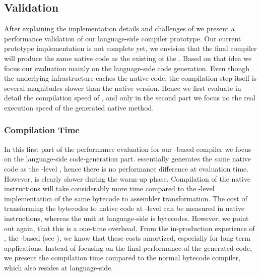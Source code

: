 
\subsection{\NBJ Validation}
After explaining the implementation details and challenges of \NBJ we present a performance validation of our language-side \JIT compiler prototype.
Our current prototype implementation is not complete yet, we envision that the final compiler will produce the same native code as the existing \JIT of the \Cog \VM.
Based on that idea we focus our evaluation mainly on the language-side code generation.
Even though the underlying \B infrastructure caches the native code, the compilation step itself is several magnitudes slower than the native \JIT version.
Hence we first evaluate in detail the compilation speed of \NBJ, and only in the second part we focus no the real execution speed of the generated native method.

\subsubsection*{Compilation Time}

In this first part of the performance evaluation for our \B-based \JIT compiler we focus on the language-side code-generation part.
\NBJ essentially generates the same native code as the \VM-level \JIT, hence there is no performance difference at evaluation time.
However, \NBJ is clearly slower during the warm-up phase.
Compilation of the native instructions will take considerably more time compared to the \VM-level implementation of the same bytecode to assembler transformation.
The cost of transforming the bytecodes to native code at \VM-level can be measured in native instructions, whereas the unit at language-side is bytecodes.
However, we point out again, that this is a one-time overhead.
From the in-production experience of \NB, the \B-based \FFI (see ), we know that these costs amortized, especially for long-term applications.
Instead of focusing on the final performance of the generated code, we present the compilation time compared to the normal \PH bytecode compiler, which also resides at language-side.

